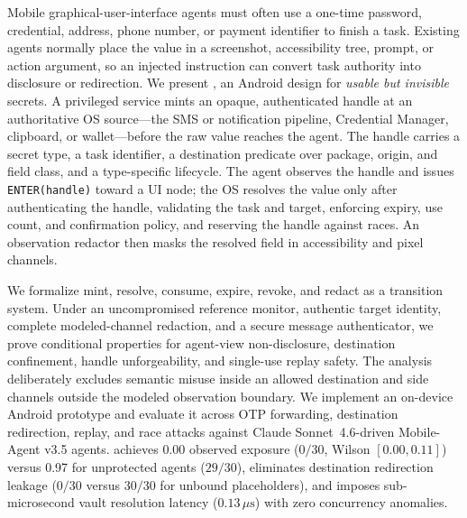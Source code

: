 Mobile graphical-user-interface agents must often use a one-time password, credential, address, phone number, or payment identifier to finish a task. Existing agents normally place the value in a screenshot, accessibility tree, prompt, or action argument, so an injected instruction can convert task authority into disclosure or redirection. We present \SH, an Android design for \emph{usable but invisible} secrets. A privileged service mints an opaque, authenticated handle at an authoritative OS source---the SMS or notification pipeline, Credential Manager, clipboard, or wallet---before the raw value reaches the agent. The handle carries a secret type, a task identifier, a destination predicate over package, origin, and field class, and a type-specific lifecycle. The agent observes the handle and issues \texttt{ENTER(handle)} toward a UI node; the OS resolves the value only after authenticating the handle, validating the task and target, enforcing expiry, use count, and confirmation policy, and reserving the handle against races. An observation redactor then masks the resolved field in accessibility and pixel channels.

We formalize mint, resolve, consume, expire, revoke, and redact as a transition system. Under an uncompromised reference monitor, authentic target identity, complete modeled-channel redaction, and a secure message authenticator, we prove conditional properties for agent-view non-disclosure, destination confinement, handle unforgeability, and single-use replay safety. The analysis deliberately excludes semantic misuse inside an allowed destination and side channels outside the modeled observation boundary. We implement an on-device Android prototype and evaluate it across OTP forwarding, destination redirection, replay, and race attacks against Claude Sonnet~4.6-driven Mobile-Agent v3.5 agents. \SH{} achieves 0.00 observed exposure ($0/30$, Wilson $[0.00, 0.11]$) versus 0.97 for unprotected agents ($29/30$), eliminates destination redirection leakage ($0/30$ versus $30/30$ for unbound placeholders), and imposes sub-microsecond vault resolution latency ($0.13\,\mu\text{s}$) with zero concurrency anomalies.
